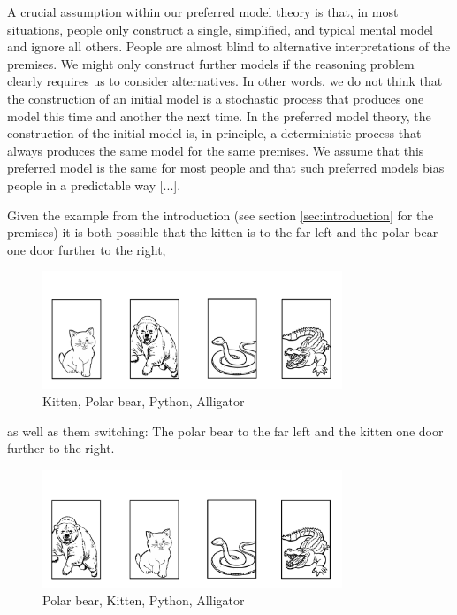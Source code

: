 \documentclass[hidelinks]{scrartcl}
\begin{document}
\begin{displayquote}
A crucial assumption within our preferred model theory is that, in most situations, people only construct a single, simplified, and typical mental model and ignore all others. People are almost blind to alternative interpretations of the \gls{premise}s. We might only construct further models if the reasoning problem clearly requires us to consider alternatives. In other words, we do not think that the construction of an initial model is a stochastic process that produces one model this time and another the next time. In the preferred model theory, the construction of the initial model is, in principle, a deterministic process that always produces the same model for the same \gls{premise}s. We assume that this preferred model is the same for most people and that such preferred models bias people in a predictable way [...]. \\
\citep{Ragni.2013}
\end{displayquote}

Given the example from the introduction (see section \ref{sec:introduction} for the premises) it is both possible that the kitten is to the far left and the polar bear one door further to the right,
\begin{figure}[H]
	\caption{Kitten, Polar bear, Python, Alligator}
	\label{fig:one_ordering}
	\centering
	\includegraphics[width=0.8\textwidth]{Illustrations/doors_animals_1.png}
\end{figure} 

as well as them switching: The polar bear to the far left and the kitten one door further to the right.
\begin{figure}[H]
	\caption{Polar bear, Kitten, Python, Alligator}
	\label{fig:different_ordering}
	\centering
	\includegraphics[width=0.8\textwidth]{Illustrations/doors_animals_2.png}
\end{figure}
\end{document}
